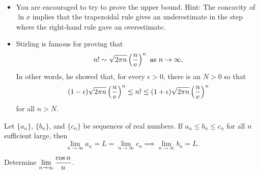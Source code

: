 \begin{remark}\,
\begin{itemize}
\item You are encouraged to try to prove the upper bound.
Hint: The concavity of $\ln x$ implies that the trapezoidal rule gives an underestimate in the step where the right-hand rule gave an overestimate.
\item Stirling is famous for proving that
\begin{equation*}
n!\sim \sqrt{2\pi n}\left(\frac{n}{\mathrm{e}}\right)^n \text{ as } n\to\infty.
\end{equation*}
In other words, he showed that, for every $\epsilon>0$, there is an $N>0$ so that
\begin{equation*}
(1-\epsilon) \sqrt{2\pi n}\left(\frac{n}{\mathrm{e}}\right)^n\le n!\le (1+\epsilon) \sqrt{2\pi n}\left(\frac{n}{\mathrm{e}}\right)^n
\end{equation*}
for all $n>N$.
\end{itemize}
\end{remark}

\newpage

\begin{theorem}
Let $\{a_n\}$, $\{b_n\}$, and $\{c_n\}$ be sequences of real numbers.
If $a_n\le b_n\le c_n$ for all $n$ sufficient large, then
\begin{equation*}
\lim_{n\to\infty}a_n = L = \lim_{n\to\infty}c_n \implies \lim_{n\to\infty}b_n= L.
\end{equation*}
\end{theorem}

\begin{example}
Determine $\displaystyle\lim_{n\to\infty}\frac{\cos n}{n}$.
\end{example}
\ifdefined\SOLUTION
{}
\else
\fi
\vfill

